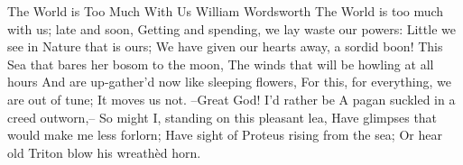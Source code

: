 \begin{poem}
{The World is Too Much With Us}
{ William Wordsworth}
 The World is too much with us; late and soon,		
 Getting and spending, we lay waste our powers:		
 Little we see in Nature that is ours;		
 We have given our hearts away, a sordid boon!		
 This Sea that bares her bosom to the moon,		
 The winds that will be howling at all hours		
 And are up-gather'd now like sleeping flowers,		
 For this, for everything, we are out of tune;		
 It moves us not. --Great God! I'd rather be		
 A pagan suckled in a creed outworn,--		
 So might I, standing on this pleasant lea,		
 Have glimpses that would make me less forlorn;		
 Have sight of Proteus rising from the sea;		
 Or hear old Triton blow his wreath\`{e}d horn.		
 \end{poem}
